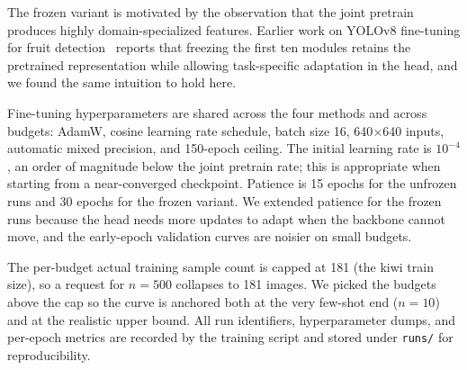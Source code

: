 The frozen variant is motivated by the observation that the joint pretrain produces highly domain-specialized features. Earlier work on YOLOv8 fine-tuning for fruit detection~\cite{gandhi2025fine} reports that freezing the first ten modules retains the pretrained representation while allowing task-specific adaptation in the head, and we found the same intuition to hold here.

Fine-tuning hyperparameters are shared across the four methods and across budgets: AdamW, cosine learning rate schedule, batch size 16, 640$\times$640 inputs, automatic mixed precision, and 150-epoch ceiling. The initial learning rate is $10^{-4}$, an order of magnitude below the joint pretrain rate; this is appropriate when starting from a near-converged checkpoint. Patience is 15 epochs for the unfrozen runs and 30 epochs for the frozen variant. We extended patience for the frozen runs because the head needs more updates to adapt when the backbone cannot move, and the early-epoch validation curves are noisier on small budgets.

The per-budget actual training sample count is capped at 181 (the kiwi train size), so a request for $n{=}500$ collapses to 181 images. We picked the budgets above the cap so the curve is anchored both at the very few-shot end ($n{=}10$) and at the realistic upper bound. All run identifiers, hyperparameter dumps, and per-epoch metrics are recorded by the training script and stored under \texttt{runs/} for reproducibility.
